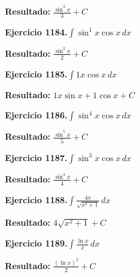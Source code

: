 \documentclass[10pt,a4paper]{article}
\begin{document}
\begin{solbox}
\textbf{Resultado:} \(\displaystyle \frac{\sin^{3}x}{3} + C\)
\end{solbox}

\begin{ejbox}
\textbf{Ejercicio 1184.}\quad $\int \sin^{1}x \cos x\,dx$
\end{ejbox}

\begin{solbox}
\textbf{Resultado:} \(\displaystyle \frac{\sin^{2}x}{2} + C\)
\end{solbox}

\begin{ejbox}
\textbf{Ejercicio 1185.}\quad $\int 1x \cos x\,dx$
\end{ejbox}

\begin{solbox}
\textbf{Resultado:} \(\displaystyle 1x\sin x + 1\cos x + C\)
\end{solbox}

\newpage
\begin{ejbox}
\textbf{Ejercicio 1186.}\quad $\int \sin^{4}x \cos x\,dx$
\end{ejbox}

\begin{solbox}
\textbf{Resultado:} \(\displaystyle \frac{\sin^{5}x}{5} + C\)
\end{solbox}

\begin{ejbox}
\textbf{Ejercicio 1187.}\quad $\int \sin^{3}x \cos x\,dx$
\end{ejbox}

\begin{solbox}
\textbf{Resultado:} \(\displaystyle \frac{\sin^{4}x}{4} + C\)
\end{solbox}

\begin{ejbox}
\textbf{Ejercicio 1188.}\quad $\int \frac{4x}{\sqrt{x^2+1}}\,dx$
\end{ejbox}

\begin{solbox}
\textbf{Resultado:} \(\displaystyle 4\sqrt{x^2+1} + C\)
\end{solbox}

\newpage
\begin{ejbox}
\textbf{Ejercicio 1189.}\quad $\int \frac{\ln x}{x}\,dx$
\end{ejbox}

\begin{solbox}
\textbf{Resultado:} \(\displaystyle \frac{(\ln x)^2}{2} + C\)
\end{solbox}
\end{document}
